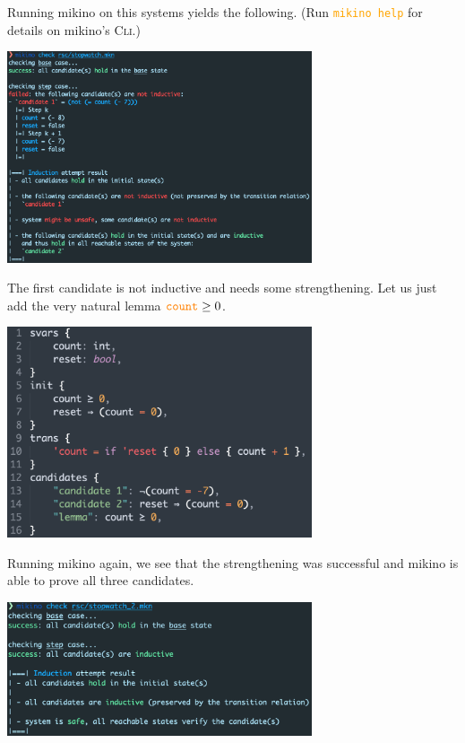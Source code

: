 \documentclass{easychair}
\newcommand{\mkn}{mikino}
\newcommand{\code}[1]{\textcolor{orange}{\texttt{#1}}}
\newcommand{\picwidth}{9cm}
\begin{document}
Running \mkn{} on this systems yields the following. (Run \code{mikino help} for details on
\mkn{}'s \textsc{Cli}.)
%
\begin{center}
    \includegraphics[width=\picwidth]{../rsc/stopwatch_run_1.png}
\end{center}
%

The first candidate is not inductive and needs some strengthening. Let us just add the very natural
lemma \(\code{count} \geq 0\).
%
\begin{center}
    \includegraphics[width=\picwidth]{../rsc/stopwatch_2.png}
\end{center}

Running \mkn{} again, we see that the strengthening was successful and \mkn{} is able to prove all
three candidates.

\begin{center}
    \includegraphics[width=\picwidth]{../rsc/stopwatch_run_2.png}
\end{center}
\end{document}
